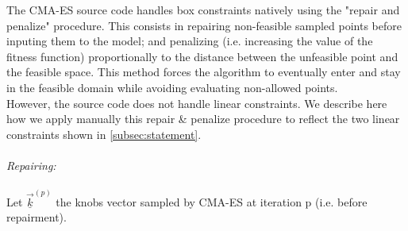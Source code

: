 The CMA-ES source code handles box constraints natively using the "repair and penalize" procedure. This consists in repairing non-feasible sampled points before inputing them to the model; and penalizing (i.e. increasing the value of the fitness function) proportionally to the distance between the unfeasible point and the feasible space. This method forces the algorithm to eventually enter and stay in the feasible domain while avoiding evaluating non-allowed points.\\
However, the source code does not handle linear constraints. We describe here how we apply manually this repair \& penalize procedure to reflect the two linear constraints shown in \ref{subsec:statement}.\\
\\

%
\emph{Repairing:}\\
\\
Let $\underline{\vec{k}}^{(p)}$ the knobs vector sampled by CMA-ES at iteration p (i.e. before repairment).\\

